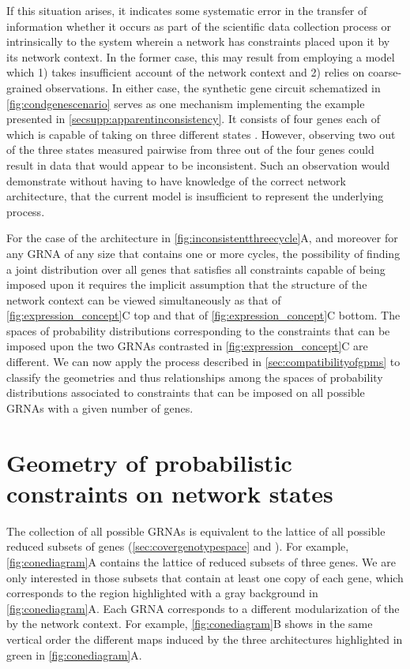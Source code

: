 If this situation arises, it indicates some systematic error in the transfer of information whether it occurs as part of the scientific data collection process or intrinsically to the system wherein a network has constraints placed upon it by its network context. In the former case, this may result from employing a model which 1) takes insufficient account of the network context and 2) relies on coarse-grained observations. In either case, the synthetic gene circuit schematized in \ref{fig:condgenescenario} serves as one mechanism implementing the example presented in  \ref{secsupp:apparentinconsistency}. It consists of four genes each of which is capable of taking on three different states \cite{Rieckh2013a}. However, observing two out of the three states measured pairwise from three out of the four genes could result in data that would appear to be inconsistent. Such an observation would demonstrate without having to have knowledge of the correct network architecture, that the current model is insufficient to represent the underlying process.

For the case of the architecture in \ref{fig:inconsistentthreecycle}A, and moreover for any GRNA of any size that contains one or more cycles, the possibility of finding a joint distribution over all genes that satisfies all constraints capable of being imposed upon it requires the implicit assumption that the structure of the network context can be viewed simultaneously as that of \ref{fig:expression_concept}C top and that of \ref{fig:expression_concept}C bottom. The spaces of probability distributions corresponding to the constraints that can be imposed upon the two GRNAs contrasted in \ref{fig:expression_concept}C are different. We can now apply the process described in \ref{sec:compatibilityofgpms} to classify the geometries and thus relationships among the spaces of probability distributions associated to constraints that can be imposed on all possible GRNAs with a given number of genes.

\section{Geometry of probabilistic constraints on network states}\label{sec:probconstrgeometry}
The collection of all possible GRNAs is equivalent to the lattice of all possible reduced subsets of genes (\ref{sec:covergenotypespace} and ). For example, \ref{fig:conediagram}A contains the lattice of reduced subsets of three genes. We are only interested in those subsets that contain at least one copy of each gene, which corresponds to the region highlighted with a gray background in \ref{fig:conediagram}A. Each GRNA corresponds to a different modularization of the \gnpm{} by the network context. For example, \ref{fig:conediagram}B shows in the same vertical order the different maps induced by the three architectures highlighted in green in \ref{fig:conediagram}A.

